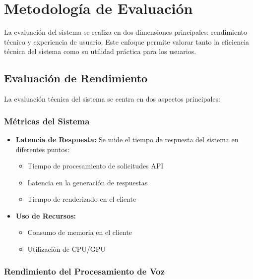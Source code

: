 \section{Metodología de Evaluación}
\label{metodologia-evaluacion}

La evaluación del sistema se realiza en dos dimensiones principales: rendimiento técnico y experiencia de usuario. Este enfoque permite valorar tanto la eficiencia técnica del sistema como su utilidad práctica para los usuarios.

\subsection{Evaluación de Rendimiento}
\label{evaluacion-rendimiento}

La evaluación técnica del sistema se centra en dos aspectos principales:

\subsubsection{Métricas del Sistema}

\begin{itemize}
	\item \textbf{Latencia de Respuesta:} Se mide el tiempo de respuesta del sistema en diferentes puntos:
	      \begin{itemize}
		      \item Tiempo de procesamiento de solicitudes API
		      \item Latencia en la generación de respuestas
		      \item Tiempo de renderizado en el cliente
	      \end{itemize}

	\item \textbf{Uso de Recursos:}
	      \begin{itemize}
		      \item Consumo de memoria en el cliente
		      \item Utilización de CPU/GPU
	      \end{itemize}
\end{itemize}

\subsubsection{Rendimiento del Procesamiento de Voz}


